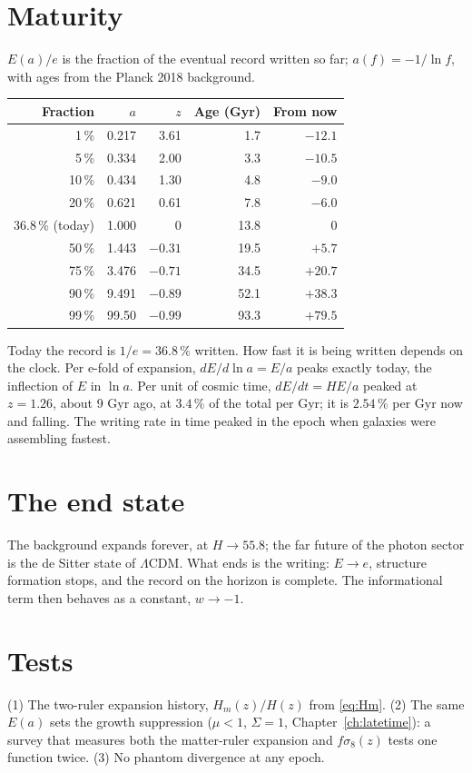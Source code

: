 \section{Maturity}
$E(a)/e$ is the fraction of the eventual record written so far; $a(f)=-1/\ln f$, with ages from the Planck 2018 background.
\begin{center}\small\begin{tabular}{rrrrr}\toprule
Fraction & $a$ & $z$ & Age (Gyr) & From now\\\midrule
1\,\% & 0.217 & 3.61 & 1.7 & $-12.1$\\ 5\,\% & 0.334 & 2.00 & 3.3 & $-10.5$\\ 10\,\% & 0.434 & 1.30 & 4.8 & $-9.0$\\
20\,\% & 0.621 & 0.61 & 7.8 & $-6.0$\\ 36.8\,\% (today) & 1.000 & 0 & 13.8 & 0\\ 50\,\% & 1.443 & $-0.31$ & 19.5 & $+5.7$\\
75\,\% & 3.476 & $-0.71$ & 34.5 & $+20.7$\\ 90\,\% & 9.491 & $-0.89$ & 52.1 & $+38.3$\\ 99\,\% & 99.50 & $-0.99$ & 93.3 & $+79.5$\\\bottomrule
\end{tabular}\end{center}
Today the record is $1/e=36.8\,\%$ written. How fast it is being written depends on the clock. Per e-fold of expansion, $dE/d\ln a=E/a$ peaks
exactly today, the inflection of $E$ in $\ln a$. Per unit of cosmic time, $dE/dt=HE/a$ peaked at $z=1.26$, about 9 Gyr ago, at $3.4\,\%$ of the
total per Gyr; it is $2.54\,\%$ per Gyr now and falling. The writing rate in time peaked in the epoch when galaxies were assembling fastest.

\section{The end state}
The background expands forever, at $H\to55.8$; the far future of the photon sector is the de Sitter state of $\Lambda$CDM. What ends is the writing:
$E\to e$, structure formation stops, and the record on the horizon is complete. The informational term then behaves as a constant, $w\to-1$.

\section{Tests}
(1) The two-ruler expansion history, $H_m(z)/H(z)$ from \eqref{eq:Hm}. (2) The same $E(a)$ sets the growth suppression ($\mu<1$, $\Sigma=1$,
Chapter~\ref{ch:latetime}): a survey that measures both the matter-ruler expansion and $f\sigma_8(z)$ tests one function twice. (3) No phantom
divergence at any epoch.
